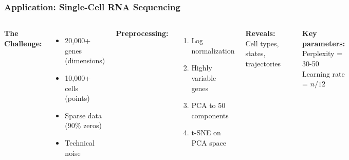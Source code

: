 \documentclass[aspectratio=169]{beamer}
\begin{document}
\begin{frame}
\frametitle{Application: Single-Cell RNA Sequencing}
\begin{columns}[T]
\textbf{The Challenge:}
\begin{itemize}
\small
\item 20,000+ genes (dimensions)
\item 10,000+ cells (points)
\item Sparse data (90\% zeros)
\item Technical noise
\end{itemize}

\vspace{0.3cm}
\textbf{Preprocessing:}
\begin{enumerate}
\small
\item Log normalization
\item Highly variable genes
\item PCA to 50 components
\item t-SNE on PCA space
\end{enumerate}

\vspace{0.3cm}
\textbf{Reveals:} Cell types, states, trajectories

\begin{center}
\end{center}

\textbf{Key parameters:}\\
\small Perplexity = 30-50\\
Learning rate = $n/12$
\end{columns}
\end{frame}
\end{document}
